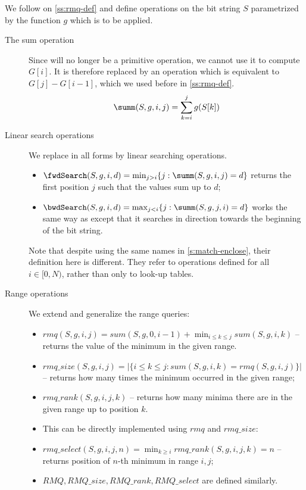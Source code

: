 We follow on \ref{ss:rmq-def} and define operations on the bit string $S$ parametrized by the function $g$ which is to be applied.
\begin{description}
	\item[The sum operation]
	Since \rank{} will no longer be a primitive operation, we cannot use it to compute $G[i]$.
	It is therefore replaced by an operation \summ{} which is equivalent to $G[j] - G[i - 1]$, which we used before in \ref{ss:rmq-def}.
	$$\summ(S, g, i, j) = \sum_{k=i}^j g(S[k])$$
	
	\item[Linear search operations]
	We replace \select{} in all forms by linear searching operations.
	\begin{itemize}
		\item $\fwdSearch(S, g, i, d) = \min_{j > i} \{j : \summ(S, g, i, j) = d\}$ returns the first position $j$ such that the values sum up to $d$;
		\item $\bwdSearch(S, g, i, d) = \max_{j < i} \{j : \summ(S, g, j, i) = d\}$ works the same way as \fwdSearch{} except that it searches in direction towards the beginning of the bit string.
	\end{itemize}
	Note that despite using the same names in \ref{s:match-enclose}, their definition here is different.
	They refer to operations defined for all $i \in [0, N)$, rather than only to look-up tables. 
	
	\item[Range operations]
	We extend and generalize the range queries:
	\begin{itemize}
		\item $rmq(S, g, i, j) = sum(S, g, 0, i - 1) + \min_{i \le k \le j} sum(S, g, i, k)$ -- returns the value of the minimum in the given range.
		\item $rmq\_size(S, g, i, j) = | \{ i \le k \le j : sum(S, g, i, k) = rmq(S, g, i, j) \} | $ -- returns how many times the minimum occurred in the given range;
		\item $rmq\_rank(S, g, i, j, k)$ -- returns how many minima there are in the given range up to position $k$.
		\item This can be directly implemented using $rmq$ and $rmq\_size$:
		\begin{algorithmic}
					\State {}
				\Else
					\State {}
				\EndIf
			\EndFunction
		\end{algorithmic}
		\item $rmq\_select(S, g, i, j, n) = \min_{k \ge i} rmq\_rank(S, g, i, j, k) = n$ -- returns position of $n$-th minimum in range $i, j$;
		\item $RMQ, RMQ\_size, RMQ\_rank, RMQ\_select$ are defined similarly.
	\end{itemize}
\end{description}

